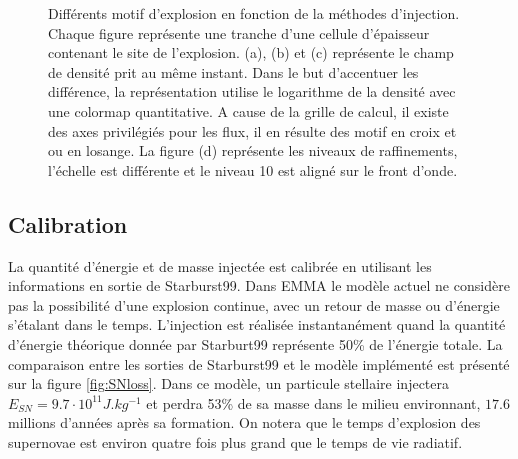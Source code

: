 \begin{figure}

    \caption[Test de Sedov - Tranches]{Différents motif d'explosion en fonction de la méthodes d'injection.
    Chaque figure représente une tranche d'une cellule d'épaisseur contenant le site de l'explosion.
    (a), (b) et (c) représente le champ de densité prit au même instant.
    Dans le but d'accentuer les différence, la représentation utilise le logarithme de la densité avec une colormap quantitative.
    A cause de la grille de calcul, il existe des axes privilégiés pour les flux, il en résulte des motif en croix et ou en losange.
    La figure (d) représente les niveaux de raffinements, l'échelle est différente et le niveau 10 est aligné sur le front d'onde.
    }
 	\label{fig:sedovslice}
\end{figure}

\subsection{Calibration}
\label{sec:sncali}

La quantité d'énergie et de masse injectée est calibrée en utilisant les informations en sortie de Starburst99.
Dans EMMA le modèle actuel ne considère pas la possibilité d'une explosion continue, avec un retour de masse ou d'énergie s'étalant dans le temps.
L'injection est réalisée instantanément quand la quantité d’énergie théorique donnée par Starburt99 représente 50\% de l’énergie totale.
La comparaison entre les sorties de Starburst99 et le modèle implémenté est présenté sur la figure \ref{fig:SNloss}.
Dans ce modèle, un particule stellaire injectera $E_{SN} = 9.7\cdot 10^{11} J.kg^{-1}$ et perdra 53\% de sa masse dans le milieu environnant, $17.6$ millions d'années après sa formation.
On notera que le temps d'explosion des supernovae est environ quatre fois plus grand que le temps de vie radiatif.

